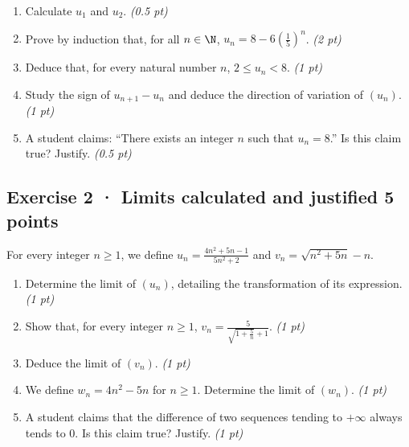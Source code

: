 \begin{enumerate}

\item Calculate $u_1$ and $u_2$. \hfill\textit{(0.5 pt)}

\item Prove by induction that, for all $n\in\N$, $u_n=8-6\left(\frac{1}{5}\right)^n$. \hfill\textit{(2 pt)}

\item Deduce that, for every natural number $n$, $2\le u_n<8$. \hfill\textit{(1 pt)}

\item Study the sign of $u_{n+1}-u_n$ and deduce the direction of variation of $(u_n)$. \hfill\textit{(1 pt)}

\item A student claims: ``There exists an integer $n$ such that $u_n=8$.'' Is this claim true? Justify. \hfill\textit{(0.5 pt)}

\end{enumerate}

\subsection*{Exercise 2 · Limits calculated and justified \hfill 5 points}For every integer $n\ge1$, we define $u_n=\frac{4n^2+5n-1}{5n^2+2}$ and $v_n=\sqrt{n^2+5n}-n$.

\begin{enumerate}

\item Determine the limit of $(u_n)$, detailing the transformation of its expression. \hfill\textit{(1 pt)}

\item Show that, for every integer $n\ge1$, $v_n=\frac{5}{\sqrt{1+\frac{5}n}+1}$. \hfill\textit{(1 pt)}

\item Deduce the limit of $(v_n)$. \hfill\textit{(1 pt)}

\item We define $w_n=4n^2-5n$ for $n\ge1$. Determine the limit of $(w_n)$. \hfill\textit{(1 pt)}

\item A student claims that the difference of two sequences tending to $+\infty$ always tends to $0$. Is this claim true? Justify. \hfill\textit{(1 pt)}

\end{enumerate}

\mxnewpage{}

